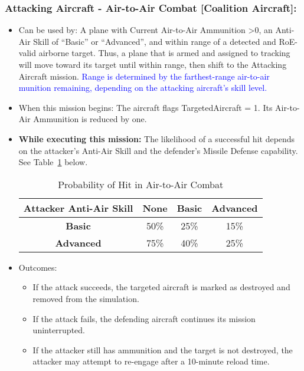\documentclass{article}
\begin{document}
    \subsubsection{Attacking Aircraft - Air-to-Air Combat [Coalition Aircraft]:}
        \begin{itemize}
            \item Can be used by: A plane with Current Air-to-Air Ammunition \textgreater 0, an Anti-Air Skill of ``Basic'' or ``Advanced'', and within range of a detected and RoE-valid airborne target. Thus, a plane that is armed and assigned to tracking will move toward its target until within range, then shift to the Attacking Aircraft mission. \textcolor{blue}{Range is determined by the farthest-range air-to-air munition remaining, depending on the attacking aircraft's skill level.}
        
            \item When this mission begins: The aircraft flags TargetedAircraft = 1. Its Air-to-Air Ammunition is reduced by one.
        
            \item \textbf{While executing this mission:} The likelihood of a successful hit depends on the attacker's Anti-Air Skill and the defender's Missile Defense capability. See Table~\ref{table:AirToAirHitChances} below.
        
            \begin{table}[h!]
            \centering
            \caption{Probability of Hit in Air-to-Air Combat}
            \label{table:AirToAirHitChances}
            \begin{tabular}{|c|c|c|c|}
                \hline
                \textbf{Attacker Anti-Air Skill} & \textbf{None} & \textbf{Basic} & \textbf{Advanced} \\
                \hline
                \textbf{Basic}    & 50\%  & 25\%  & 15\% \\
                \textbf{Advanced} & 75\%  & 40\%  & 25\% \\
                \hline
            \end{tabular}
            \end{table}
        
            \item Outcomes:
            \begin{itemize}
                \item If the attack succeeds, the targeted aircraft is marked as destroyed and removed from the simulation.
                \item If the attack fails, the defending aircraft continues its mission uninterrupted.
                \item If the attacker still has ammunition and the target is not destroyed, the attacker may attempt to re-engage after a 10-minute reload time.
            \end{itemize}
        

\end{itemize}
\end{document}
